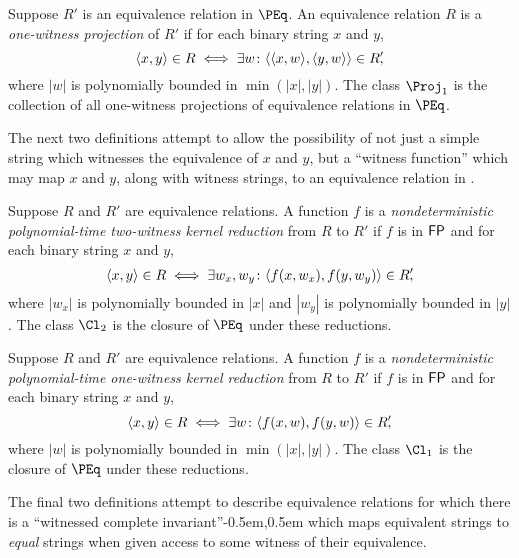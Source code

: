 \begin{definition}\label{def:npeq4}
  Suppose $R'$ is an equivalence relation in $\PEq$.
  An equivalence relation $R$ is a \emph{one-witness projection} of $R'$ if for each binary string $x$ and $y$,
  \begin{displaymath}
    \langle x,y\rangle \in R \iff \exists w \colon \langle\langle x,w\rangle,\langle y,w\rangle\rangle \in R'\kern-0.3em,
  \end{displaymath}
  where $|w|$ is polynomially bounded in $\min(|x|, |y|)$.
  The class $\Proj_1$ is the collection of all one-witness projections of equivalence relations in $\PEq$.
\end{definition}

The next two definitions attempt to allow the possibility of not just a simple string which witnesses the equivalence of $x$ and $y$, but a ``witness function'' which may map $x$ and $y$, along with witness strings, to an equivalence relation in \PEq.

\begin{definition}\label{def:npeq5}
  Suppose $R$ and $R'$ are equivalence relations.
  A function $f$ is a \emph{nondeterministic polynomial-time two-witness kernel reduction} from $R$ to $R'$ if $f$ is in ${\mathsf{FP}}$ and for each binary string $x$ and $y$,
  \begin{displaymath}
    \langle x,y\rangle \in R \iff \exists w_x, w_y \colon \langle f(x, w_x),f(y, w_y)\rangle \in R'\kern-0.3em,
  \end{displaymath}
  where $|w_x|$ is polynomially bounded in $|x|$ and $|w_y|$ is polynomially bounded in $|y|$.
  The class $\Cl_2$ is the closure of $\PEq$ under these reductions.
\end{definition}

\begin{definition}\label{def:npeq6}
  Suppose $R$ and $R'$ are equivalence relations.
  A function $f$ is a \emph{nondeterministic polynomial-time one-witness kernel reduction} from $R$ to $R'$ if $f$ is in ${\mathsf{FP}}$ and for each binary string $x$ and $y$,
  \begin{displaymath}
    \langle x,y\rangle \in R \iff \exists w \colon \langle f(x, w),f(y, w)\rangle \in R'\kern-0.3em,
  \end{displaymath}
  where $|w|$ is polynomially bounded in $\min(|x|, |y|)$.
  The class $\Cl_1$ is the closure of $\PEq$ under these reductions.
\end{definition}

The final two definitions attempt to describe equivalence relations for which there is a ``witnessed complete invariant''\kern-0.5em,\kern0.5em which maps equivalent strings to \emph{equal} strings when given access to some witness of their equivalence.

